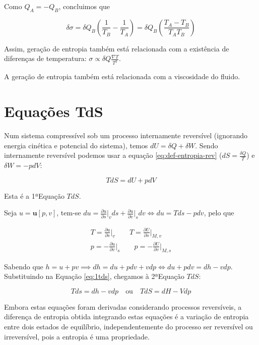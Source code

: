 Como $Q_A = -Q_B$, concluimos que

\begin{equation*}
    \delta \sigma = \delta Q_B \left( \frac{1}{T_B} - \frac{1}{T_A} \right) = \delta Q_B \left( \frac{T_A - T_B}{T_A T_B} \right)
\end{equation*}

Assim, geração de entropia também está relacionada com a existência de diferenças de temperatura: $\sigma \propto \delta Q \frac{\nabla T}{T^2}$.

A geração de entropia também está relacionada com a viscosidade do fluido.


\section{Equações TdS}

Num sistema compressível sob um processo internamente reversível (ignorando energia cinética e potencial do sistema), temos $dU = \delta Q + \delta W$. Sendo internamente reversível podemos usar a equação \ref{eq:def-entropia-rev} ($dS = \frac{\delta Q}{T}$) e $\delta W = -p dV$:

\begin{equation} \label{eq:1tds}
    T dS = dU + p dV
\end{equation}

Esta é a 1ªEquação $TdS$.

Seja $u = \mathbf{u}[p, v]$, tem-se $du = \frac{\partial u}{\partial s}\bigr|_{v} ds + \frac{\partial u}{\partial v}\bigr|_{s} dv \Longleftrightarrow du = T ds - p dv$, pelo que 

\begin{eqnarray}
    T = \frac{\partial u}{\partial s}\bigr|_{v} \qquad T = \frac{\partial U}{\partial s}\bigr|_{M,v}\\
    p = - \frac{\partial u}{\partial v}\bigr|_{s} \qquad p = - \frac{\partial U}{\partial v}\bigr|_{M,s}
\end{eqnarray}


Sabendo que $h = u + pv \implies dh = du + pdv + vdp \Longleftrightarrow du+pdv = dh - vdp$. Substituindo na Equação \ref{eq:1tds}, chegamos à 2ªEquação $TdS$:

\begin{equation} \label{eq:2tds}
    Tds = dh - v dp \quad \text{ou} \quad TdS = dH - Vdp
\end{equation}

Embora estas equações foram derivadas considerando processos reversíveis, a diferença de entropia obtida integrando estas equações é a variação de entropia entre dois estados de equilíbrio, independentemente do processo ser reversível ou irreversível, pois a entropia é uma propriedade.


